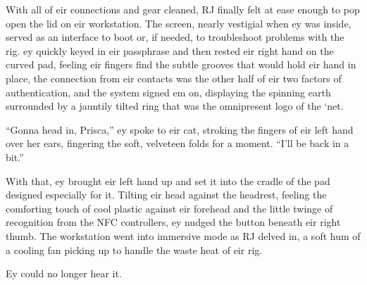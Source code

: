 With all of eir connections and gear cleaned, RJ finally felt at ease enough to pop open the lid on eir workstation.  The screen, nearly vestigial when ey was inside, served as an interface to boot or, if needed, to troubleshoot problems with the rig.  ey quickly keyed in eir passphrase and then rested eir right hand on the curved pad, feeling eir fingers find the subtle grooves that would hold eir hand in place, the connection from eir contacts was the other half of eir two factors of authentication, and the system signed em on, displaying the spinning earth surrounded by a jauntily tilted ring that was the omnipresent logo of the `net.

``Gonna head in, Prisca,'' ey spoke to eir cat, stroking the fingers of eir left hand over her ears, fingering the soft, velveteen folds for a moment.  ``I'll be back in a bit.''

With that, ey brought eir left hand up and set it into the cradle of the pad designed especially for it.  Tilting eir head against the headrest, feeling the comforting touch of cool plastic against eir forehead and the little twinge of recognition from the NFC controllers, ey nudged the button beneath eir right thumb.  The workstation went into immersive mode as RJ delved in, a soft hum of a cooling fan picking up to handle the waste heat of eir rig.

Ey could no longer hear it.
